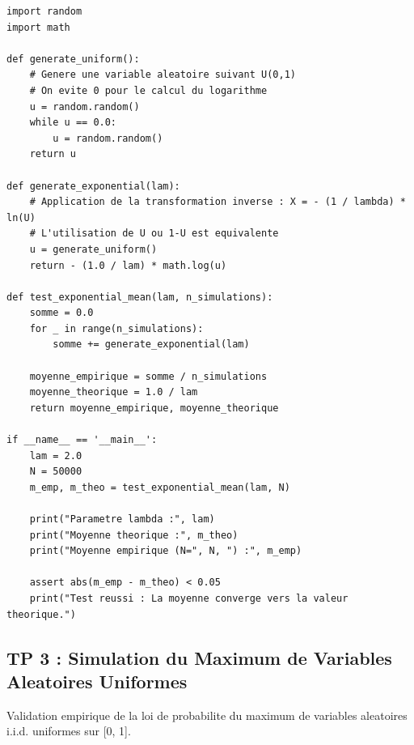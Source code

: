\documentclass[11pt,a4paper]{article}
\begin{document}
\begin{lstlisting}
import random
import math

def generate_uniform():
    # Genere une variable aleatoire suivant U(0,1)
    # On evite 0 pour le calcul du logarithme
    u = random.random()
    while u == 0.0:
        u = random.random()
    return u

def generate_exponential(lam):
    # Application de la transformation inverse : X = - (1 / lambda) * ln(U)
    # L'utilisation de U ou 1-U est equivalente
    u = generate_uniform()
    return - (1.0 / lam) * math.log(u)

def test_exponential_mean(lam, n_simulations):
    somme = 0.0
    for _ in range(n_simulations):
        somme += generate_exponential(lam)

    moyenne_empirique = somme / n_simulations
    moyenne_theorique = 1.0 / lam
    return moyenne_empirique, moyenne_theorique

if __name__ == '__main__':
    lam = 2.0
    N = 50000
    m_emp, m_theo = test_exponential_mean(lam, N)

    print("Parametre lambda :", lam)
    print("Moyenne theorique :", m_theo)
    print("Moyenne empirique (N=", N, ") :", m_emp)

    assert abs(m_emp - m_theo) < 0.05
    print("Test reussi : La moyenne converge vers la valeur theorique.")

\end{lstlisting}


\subsection*{TP 3 : Simulation du Maximum de Variables Aleatoires Uniformes}

Validation empirique de la loi de probabilite du maximum de variables aleatoires i.i.d. uniformes sur [0, 1].
\end{document}
